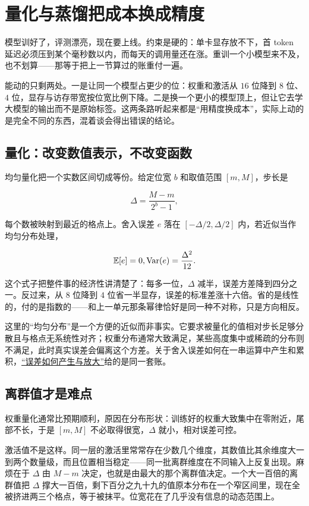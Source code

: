 \section{量化与蒸馏把成本换成精度}
\label{sec:14-Deep-Learning/09-Scaling-and-Adaptation/04}

模型训好了，评测漂亮，现在要上线。约束是硬的：单卡显存放不下，首 token 延迟必须压到某个毫秒数以内，而每天的调用量还在涨。重训一个小模型来不及，也不划算——那等于把上一节算过的账重付一遍。

能动的只剩两处。一是让同一个模型占更少的位：权重和激活从 \(16\) 位降到 \(8\) 位、\(4\) 位，显存与访存带宽按位宽比例下降。二是换一个更小的模型顶上，但让它去学大模型的输出而不是原始标签。这两条路听起来都是``用精度换成本''，实际上动的是完全不同的东西，混着谈会得出错误的结论。

\subsection{量化：改变数值表示，不改变函数}

均匀量化把一个实数区间切成等份。给定位宽 \(b\) 和取值范围 \([m, M]\)，步长是

\[
  \Delta = \frac{M - m}{2^{b} - 1},
\]

每个数被映射到最近的格点上。舍入误差 \(e\) 落在 \([-\Delta/2, \Delta/2]\) 内，若近似当作均匀分布处理，

\[
  \mathbb{E}[e] = 0, \space \operatorname{Var}(e) = \frac{\Delta^{2}}{12}.
\]

这个式子把整件事的经济性讲清楚了：每多一位，\(\Delta\) 减半，误差方差降到四分之一。反过来，从 \(8\) 位降到 \(4\) 位省一半显存，误差的标准差涨十六倍。省的是线性的，付的是指数的——和上一单元那条幂律恰好是同一种不对称，只是方向相反。

这里的``均匀分布''是一个方便的近似而非事实。它要求被量化的值相对步长足够分散且与格点无系统性对齐；权重分布通常大致满足，某些高度集中或稀疏的分布则不满足，此时真实误差会偏离这个方差。关于舍入误差如何在一串运算中产生和累积，\hyperref[sec:08-Numerical-Analysis/01-Floating-Point-and-Error/02]{``误差如何产生与放大''}给的是同一套账。

\subsection{离群值才是难点}

权重量化通常比预期顺利，原因在分布形状：训练好的权重大致集中在零附近，尾部不长，于是 \([m, M]\) 不必取得很宽，\(\Delta\) 就小，相对误差可控。

激活值不是这样。同一层的激活里常常存在少数几个维度，其数值比其余维度大一到两个数量级，而且位置相当稳定——同一批离群维度在不同输入上反复出现。麻烦在于 \(\Delta\) 由 \(M - m\) 决定，也就是由最大的那个离群值决定。一个大一百倍的离群值把 \(\Delta\) 撑大一百倍，剩下百分之九十九的值原本分布在一个窄区间里，现在全被挤进两三个格点，等于被抹平。位宽花在了几乎没有信息的动态范围上。

